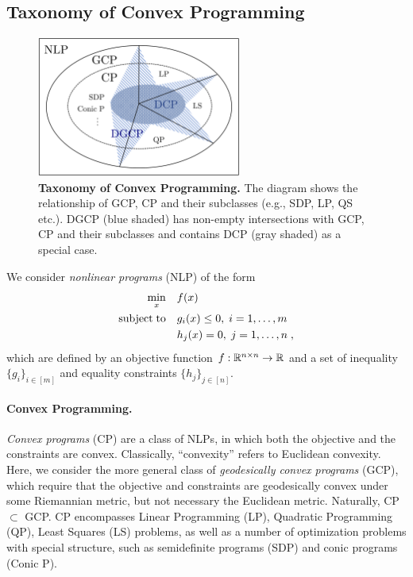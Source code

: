 \documentclass[twoside,11pt]{article}
\begin{document}
\subsection{Taxonomy of Convex Programming}
%
\begin{figure}[t]
    \centering
\includegraphics[width=0.6\textwidth]{figures/taxonomy.png}
    \caption{\textbf{Taxonomy of Convex Programming.}
     The diagram shows the relationship of GCP, CP and their subclasses (e.g., SDP, LP, QS etc.). DGCP (blue shaded) has non-empty intersections with GCP, CP and their subclasses and contains DCP (gray shaded) as a special case.
    }

    \label{fig:taxonomy}
\end{figure}
%
We consider \emph{nonlinear programs} (NLP) of the form
\begin{align}\label{eq:nlp}
    \min_{x} \quad &f(x) \\
    {\rm subject \; to} \quad &g_i(x) \leq 0, \; i=1,\dots,m \nonumber \\
    &h_j(x) = 0, \; j=1,\dots,n \; ,\nonumber
\end{align}
which are defined by an objective function $f: \mathbb{R}^{n \times n} \rightarrow \mathbb{R}$ and a set of inequality $\{g_i\}_{i \in [m]}$ and equality constraints $\{h_j\}_{j \in [n]}$. 

\paragraph{Convex Programming.} \emph{Convex programs} (CP) are a class of NLPs, in which both the objective and the constraints are convex. Classically, ``convexity'' refers to Euclidean convexity. Here, we consider the more general class of \emph{geodesically convex programs} (GCP), which require that the objective and constraints are geodesically convex under some Riemannian metric, but not necessary the Euclidean metric. Naturally, CP $\subset$ GCP. CP encompasses Linear Programming (LP), Quadratic Programming (QP), Least Squares (LS) problems, as well as a number of optimization problems with special structure, such as semidefinite programs (SDP) and conic programs (Conic P). 
\end{document}

